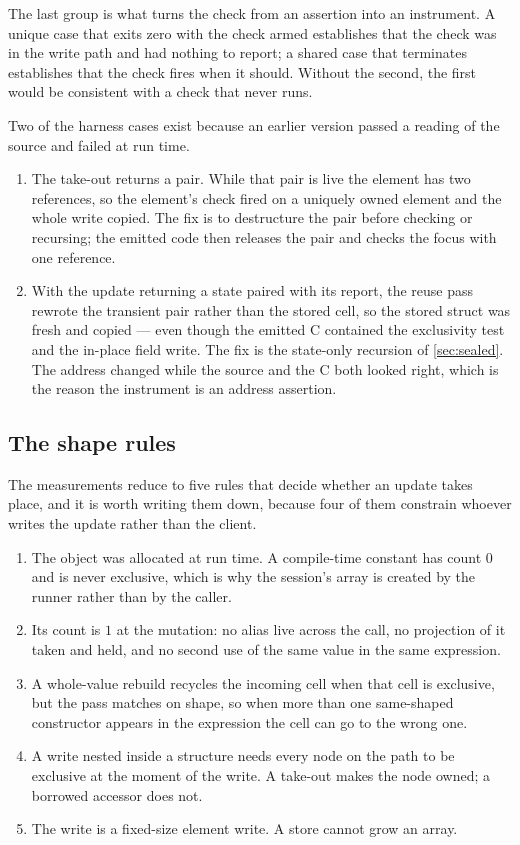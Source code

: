 \documentclass[11pt,a4paper]{article}
\theoremstyle{definition}
\theoremstyle{plain}
\begin{document}
The last group is what turns the check from an assertion into an instrument. A
unique case that exits zero with the check armed establishes that the check was
in the write path and had nothing to report; a shared case that terminates
establishes that the check fires when it should. Without the second, the first
would be consistent with a check that never runs.

Two of the harness cases exist because an earlier version passed a reading of the
source and failed at run time.

\begin{enumerate}[leftmargin=1.4em,itemsep=2pt]
\item The take-out returns a pair. While that pair is live the element has two
references, so the element's check fired on a uniquely owned element and the
whole write copied. The fix is to destructure the pair before checking or
recursing; the emitted code then releases the pair and checks the focus with one
reference.
\item With the update returning a state paired with its report, the reuse pass
rewrote the transient pair rather than the stored cell, so the stored struct was
fresh and copied --- even though the emitted C contained the exclusivity test and
the in-place field write. The fix is the state-only recursion of
\cref{sec:sealed}. The address changed while the source and the C both looked
right, which is the reason the instrument is an address assertion.
\end{enumerate}

\subsection{The shape rules}

The measurements reduce to five rules that decide whether an update takes place,
and it is worth writing them down, because four of them constrain whoever writes
the update rather than the client.

\begin{enumerate}[leftmargin=1.4em,itemsep=2pt]
\item The object was allocated at run time. A compile-time constant has count $0$
and is never exclusive, which is why the session's array is created by the
runner rather than by the caller.
\item Its count is $1$ at the mutation: no alias live across the call, no
projection of it taken and held, and no second use of the same value in the same
expression.
\item A whole-value rebuild recycles the incoming cell when that cell is
exclusive, but the pass matches on shape, so when more than one same-shaped
constructor appears in the expression the cell can go to the wrong one.
\item A write nested inside a structure needs every node on the path to be
exclusive at the moment of the write. A take-out makes the node owned; a
borrowed accessor does not.
\item The write is a fixed-size element write. A store cannot grow an array.
\end{enumerate}
\end{document}
